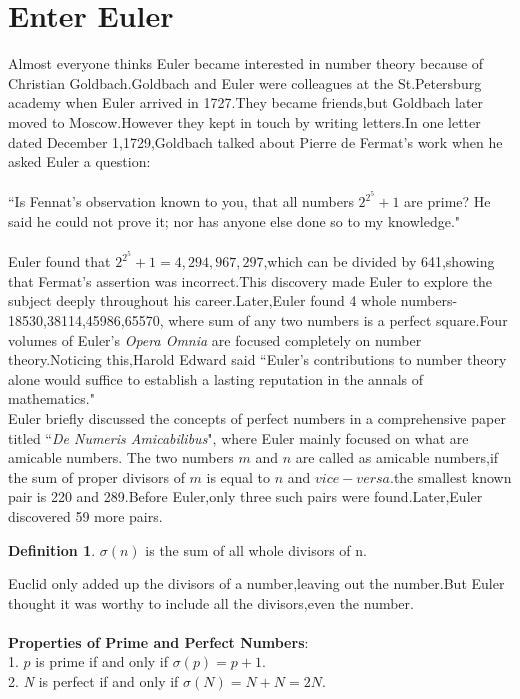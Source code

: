 \documentclass[a4paper,reqno,11pt]{book}
\theoremstyle{plain}%
\theoremstyle{definition}
\newtheorem{defn}{Definition}[chapter]
\begin{document}
\section{Enter Euler}
Almost everyone thinks Euler became interested in number theory because of Christian Goldbach.Goldbach and Euler were colleagues at the St.Petersburg academy when Euler arrived in 1727.They became friends,but Goldbach later moved to Moscow.However they kept in touch by writing letters.In one letter dated December 1,1729,Goldbach talked about Pierre de Fermat's work when he asked Euler a question:\\
\\
``Is Fennat's observation known to you, that all numbers $2^{2^5}+1$ are 
prime? He said he could not prove it; nor has anyone else done so to 
my knowledge."\\
\\
Euler found that $2^{2^5}+1=4,294,967,297$,which can be divided by 641,showing that Fermat's assertion was incorrect.This discovery made Euler to explore the subject deeply throughout his career.Later,Euler found 4 whole numbers-18530,38114,45986,65570, where sum of any two numbers is a perfect square.Four volumes of Euler's \textit{Opera Omnia} are focused completely on number theory.Noticing this,Harold Edward said ``Euler's contributions to number theory alone would suffice to establish a lasting reputation in the annals of mathematics."\\
\indent Euler briefly discussed the concepts of perfect numbers in a comprehensive paper titled ``\textit{De Numeris Amicabilibus}", where Euler mainly focused on what are amicable numbers.
The two numbers $m$ and $n$ are called as amicable numbers,if the sum of proper divisors of $m$ is equal to $n$ and $vice-versa$.the smallest known pair is 220 and 289.Before Euler,only three such pairs were found.Later,Euler discovered 59 more pairs.
\begin{defn}\label{defn:Type 3}
$\sigma(n)$ is the sum of all whole divisors of n.
\end{defn}
Euclid only added up the divisors of a number,leaving out the number.But Euler thought it was worthy to include all the divisors,even the number.\\
\\
\textbf{Properties of Prime and Perfect Numbers}:\\
1. $p$ is prime if and only if $\sigma(p)=p+1$.\\
2. \textit{N} is perfect if and only if $\sigma(N)=N+N=2N$.\\
\end{document}
